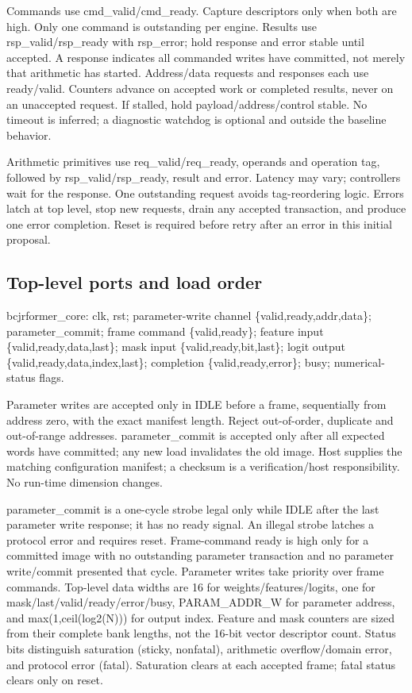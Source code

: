 \documentclass[11pt,a4paper]{article}
\begin{document}
Commands use cmd\_valid/cmd\_ready. Capture descriptors only when both are high. Only one command is outstanding per engine. Results use rsp\_valid/rsp\_ready with rsp\_error; hold response and error stable until accepted. A response indicates all commanded writes have committed, not merely that arithmetic has started. Address/data requests and responses each use ready/valid. Counters advance on accepted work or completed results, never on an unaccepted request. If stalled, hold payload/address/control stable. No timeout is inferred; a diagnostic watchdog is optional and outside the baseline behavior.

Arithmetic primitives use req\_valid/req\_ready, operands and operation tag, followed by rsp\_valid/rsp\_ready, result and error. Latency may vary; controllers wait for the response. One outstanding request avoids tag-reordering logic. Errors latch at top level, stop new requests, drain any accepted transaction, and produce one error completion. Reset is required before retry after an error in this initial proposal.

\subsection{Top-level ports and load order}

bcjrformer\_core: clk, rst; parameter-write channel \{valid,ready,addr,data\}; parameter\_commit; frame command \{valid,ready\}; feature input \{valid,ready,data,last\}; mask input \{valid,ready,bit,last\}; logit output \{valid,ready,data,index,last\}; completion \{valid,ready,error\}; busy; numerical-status flags.

Parameter writes are accepted only in IDLE before a frame, sequentially from address zero, with the exact manifest length. Reject out-of-order, duplicate and out-of-range addresses. parameter\_commit is accepted only after all expected words have committed; any new load invalidates the old image. Host supplies the matching configuration manifest; a checksum is a verification/host responsibility. No run-time dimension changes.

parameter\_commit is a one-cycle strobe legal only while IDLE after the last parameter write response; it has no ready signal. An illegal strobe latches a protocol error and requires reset. Frame-command ready is high only for a committed image with no outstanding parameter transaction and no parameter write/commit presented that cycle. Parameter writes take priority over frame commands. Top-level data widths are 16 for weights/features/logits, one for mask/last/valid/ready/error/busy, PARAM\_ADDR\_W for parameter address, and max(1,ceil(log2(N))) for output index. Feature and mask counters are sized from their complete bank lengths, not the 16-bit vector descriptor count. Status bits distinguish saturation (sticky, nonfatal), arithmetic overflow/domain error, and protocol error (fatal). Saturation clears at each accepted frame; fatal status clears only on reset.
\end{document}
